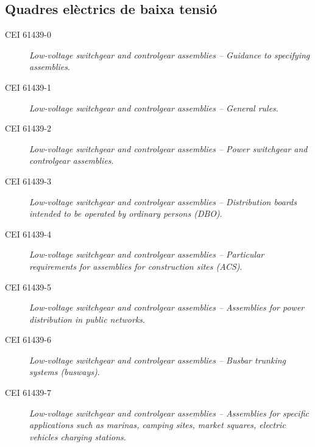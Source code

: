 \subsection*{Quadres elèctrics de baixa tensió}
\begin{description}
    \item [\hspace{5mm}CEI 61439-0] \textit{Low-voltage switchgear and controlgear assemblies -- Guidance to specifying assemblies}.
    \item [\hspace{5mm}CEI 61439-1] \textit{Low-voltage switchgear and controlgear assemblies -- General rules}.
    \item [\hspace{5mm}CEI 61439-2] \textit{Low-voltage switchgear and controlgear assemblies -- Power switchgear and controlgear assemblies}.
    \item [\hspace{5mm}CEI 61439-3] \textit{Low-voltage switchgear and controlgear assemblies -- Distribution boards intended to be operated by ordinary persons (DBO)}.
    \item [\hspace{5mm}CEI 61439-4] \textit{Low-voltage switchgear and controlgear assemblies -- Particular requirements for assemblies for construction sites (ACS)}.
    \item [\hspace{5mm}CEI 61439-5] \textit{Low-voltage switchgear and controlgear assemblies -- Assemblies for power distribution in public networks}.
    \item [\hspace{5mm}CEI 61439-6] \textit{Low-voltage switchgear and controlgear assemblies -- Busbar trunking systems (bus\-ways)}.
    \item [\hspace{5mm}CEI 61439-7] \textit{Low-voltage switchgear and controlgear assemblies -- Assemblies for specific applications such as marinas, camping sites, market squares, electric vehicles charging stations}.
\end{description}

